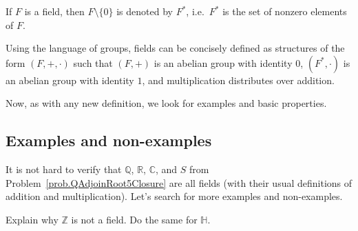 \begin{definition}
If $F$ is a field, then $F\setminus\{0\}$ is denoted by $F^*$, i.e.~$F^*$ is the set of nonzero elements of $F$.
\end{definition}

Using the language of groups, fields can be concisely defined as structures of the form $(F,+,\cdot)$ such that $(F,+)$ is an abelian group with identity $0$,  $(F^*,\cdot)$ is an abelian group with identity $1$, and multiplication distributes over addition.

Now, as with any new definition, we look for examples and basic properties.

\subsection{Examples and non-examples}

It is not hard to verify that $\mathbb{Q}$, $\mathbb{R}$, $\mathbb{C}$, and $S$ from Problem~\ref{prob.QAdjoinRoot5Closure} are all fields (with their usual definitions of addition and multiplication). Let's search for more examples and non-examples.

\begin{problem}
Explain why $\mathbb{Z}$ is not a field. Do the same for $\mathbb{H}$.
\end{problem}

